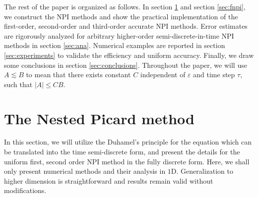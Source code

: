 \documentclass[final,leqno,showlabe]{siamltex}
\begin{document}
The rest of the paper is organized as follows. In section \ref{sec:npi} and section \ref{sec:fnpi}, we construct the NPI methods and show the practical implementation of the first-order, second-order and third-order accurate NPI methods. Error estimates are rigorously analyzed for  arbitrary higher-order semi-discrete-in-time NPI methods in section \ref{sec:ana}. Numerical examples are reported in section \ref{sec:experiments} to validate the efficiency and uniform accuracy. Finally, we draw some conclusions in section \ref{sec:conclusions}. Throughout the paper, we will use $A\lesssim B$ to mean that there exists constant $C$ independent of $\varepsilon$ and time step $\tau$, such that
$|A|\leq CB$.

\section{The Nested Picard method}
\label{sec:npi}
In this section, we will utilize the Duhamel's principle for the equation which can be translated into the time semi-discrete form, and present the details for the uniform first, second order NPI method in the fully discrete form. Here, we shall only present numerical methods and their analysis in $1$D. Generalization to higher dimension is straightforward and results remain valid without modifications.
\end{document}
